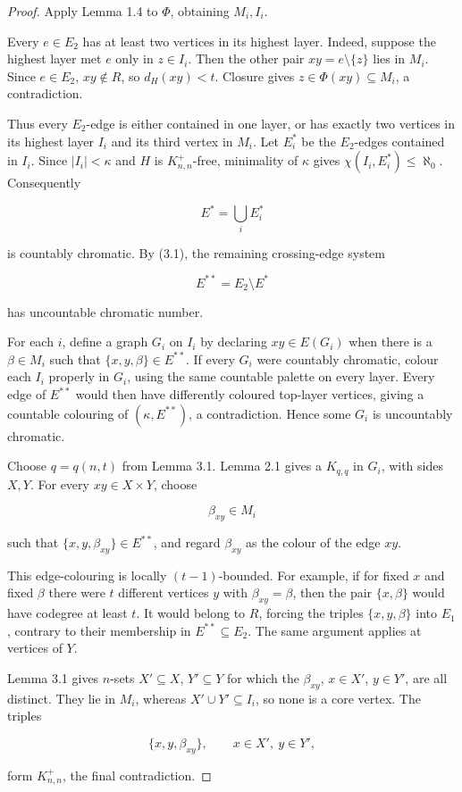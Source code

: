 \documentclass[a4paper,11pt,reqno]{amsart}
\theoremstyle{plain}
\theoremstyle{definition}
\theoremstyle{remark}
\begin{document}
\begin{proof}
Apply Lemma 1.4 to \(\Phi\), obtaining \(M_i,I_i\).

Every \(e\in E_2\) has at least two vertices in its highest layer. Indeed, suppose the highest layer met \(e\) only in \(z\in I_i\). Then the other pair \(xy=e\setminus\{z\}\) lies in \(M_i\). Since \(e\in E_2\), \(xy\notin R\), so \(d_H(xy)<t\). Closure gives \(z\in\Phi(xy)\subseteq M_i\), a contradiction.

Thus every \(E_2\)-edge is either contained in one layer, or has exactly two vertices in its highest layer \(I_i\) and its third vertex in \(M_i\). Let \(E_i^*\) be the \(E_2\)-edges contained in \(I_i\). Since \(|I_i|<\kappa\) and \(H\) is \(K_{n,n}^{+}\)-free, minimality of \(\kappa\) gives \(\chi(I_i,E_i^*)\le\aleph_0\). Consequently

\[
E^*=\bigcup_iE_i^*
\]

is countably chromatic. By (3.1), the remaining crossing-edge system

\[
E^{**}=E_2\setminus E^*
\]

has uncountable chromatic number.

For each \(i\), define a graph \(G_i\) on \(I_i\) by declaring \(xy\in E(G_i)\) when there is a \(\beta\in M_i\) such that \(\{x,y,\beta\}\in E^{**}\). If every \(G_i\) were countably chromatic, colour each \(I_i\) properly in \(G_i\), using the same countable palette on every layer. Every edge of \(E^{**}\) would then have differently coloured top-layer vertices, giving a countable colouring of \((\kappa,E^{**})\), a contradiction. Hence some \(G_i\) is uncountably chromatic.

Choose \(q=q(n,t)\) from Lemma 3.1. Lemma 2.1 gives a \(K_{q,q}\) in \(G_i\), with sides \(X,Y\). For every \(xy\in X\times Y\), choose

\[
\beta_{xy}\in M_i
\]

such that \(\{x,y,\beta_{xy}\}\in E^{**}\), and regard \(\beta_{xy}\) as the colour of the edge \(xy\).

This edge-colouring is locally \((t-1)\)-bounded. For example, if for fixed \(x\) and fixed \(\beta\) there were \(t\) different vertices \(y\) with \(\beta_{xy}=\beta\), then the pair \(\{x,\beta\}\) would have codegree at least \(t\). It would belong to \(R\), forcing the triples \(\{x,y,\beta\}\) into \(E_1\), contrary to their membership in \(E^{**}\subseteq E_2\). The same argument applies at vertices of \(Y\).

Lemma 3.1 gives \(n\)-sets \(X'\subseteq X\), \(Y'\subseteq Y\) for which the \(\beta_{xy}\), \(x\in X'\), \(y\in Y'\), are all distinct. They lie in \(M_i\), whereas \(X'\cup Y'\subseteq I_i\), so none is a core vertex. The triples

\[
\{x,y,\beta_{xy}\},
\qquad x\in X',\ y\in Y',
\]

form \(K_{n,n}^{+}\), the final contradiction.
\end{proof}
\end{document}
